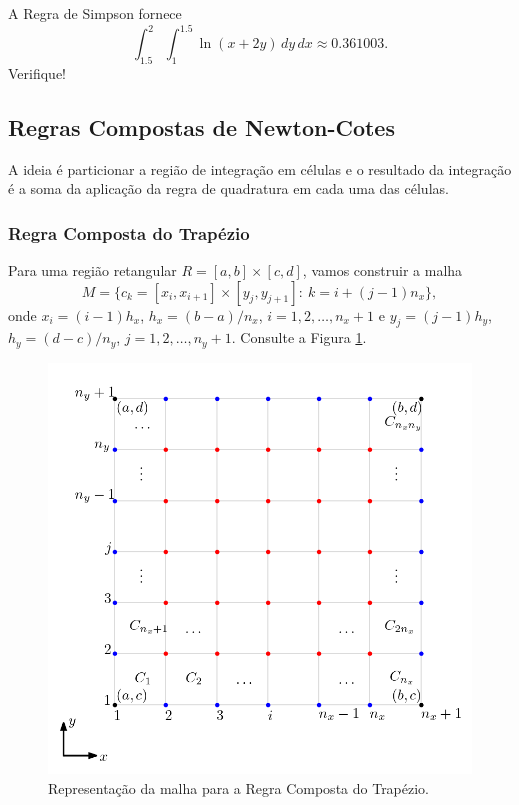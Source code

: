 \begin{ex}
  A Regra de Simpson fornece
  \begin{equation}
    \int_{1.5}^{2}\int_{1}^{1.5}\ln(x + 2y)\,dy\,dx \approx 0.361003.
  \end{equation}
  Verifique!
\end{ex}

\subsection{Regras Compostas de Newton-Cotes}

A ideia é particionar a região de integração em células e o resultado da integração é a soma da aplicação da regra de quadratura em cada uma das células.

\subsubsection{Regra Composta do Trapézio}

Para uma região retangular $R = [a,b]\times [c,d]$, vamos construir a malha
\begin{equation}
  M = \{c_k=[x_i,x_{i+1}]\times [y_j,y_{j+1}]:~k=i + (j-1)n_x\},
\end{equation}
onde $x_i=(i-1)h_x$, $h_x = (b-a)/n_x$, $i=1,2,\dotsc,n_x+1$ e $y_j=(j-1)h_y$, $h_y=(d-c)/n_y$, $j=1,2,\dotsc,n_y+1$. Consulte a Figura \ref{fig:malhaTrap}.

\begin{figure}[H]
  \centering
  \includegraphics{./cap_integracao/dados/figMalhaTrap/fig}
  \caption{Representação da malha para a Regra Composta do Trapézio.}
  \label{fig:malhaTrap}
\end{figure}

